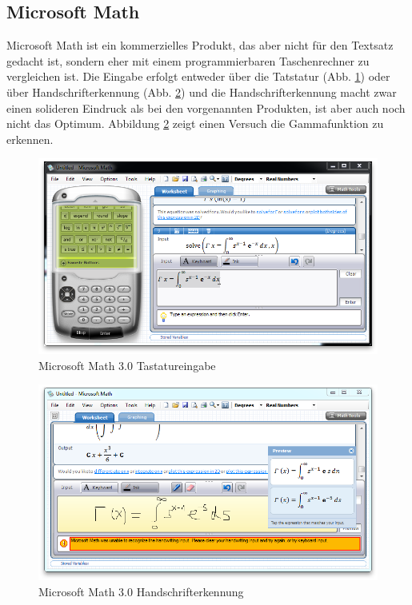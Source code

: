 \subsection{Microsoft Math}

Microsoft Math ist ein kommerzielles Produkt, das aber nicht für den Textsatz gedacht ist, sondern eher mit einem programmierbaren Taschenrechner zu vergleichen ist. Die Eingabe erfolgt entweder über die Tatstatur (Abb. \ref{fig:ms-math-keyboard}) oder über Handschrifterkennung (Abb. \ref{fig:ms-math-ink}) und die Handschrifterkennung macht zwar einen solideren Eindruck als bei den vorgenannten Produkten, ist aber auch noch nicht das Optimum. Abbildung \ref{fig:ms-math-ink} zeigt einen Versuch die Gammafunktion zu erkennen.

\begin{figure}[htbp]
  \begin{center}
    \includegraphics[width=.8\textwidth]{figures/ms-math-keyboard.png}
  \end{center}
  \caption{Microsoft Math 3.0 Tastatureingabe}
  \label{fig:ms-math-keyboard}
\end{figure}

\begin{figure}[htbp]
  \begin{center}
    \includegraphics[width=.8\textwidth]{figures/ms-math-ink.png}
  \end{center}
  \caption{Microsoft Math 3.0 Handschrifterkennung}
  \label{fig:ms-math-ink}
\end{figure}


